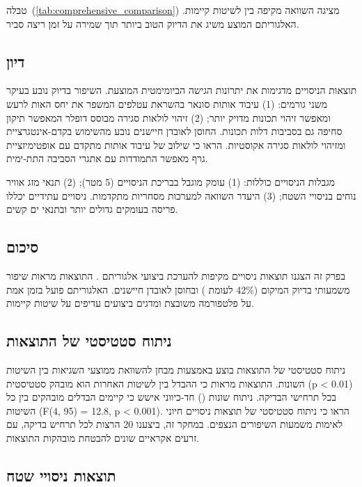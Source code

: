 טבלה~(\ref{tab:comprehensive_comparison}) מציגה השוואה מקיפה בין  לשיטות קיימות. האלגוריתם המוצע משיג את הדיוק הטוב ביותר תוך שמירה על זמן ריצה סביר.

\subsection{דיון}
\label{sec:discussion}

תוצאות הניסויים מדגימות את יתרונות הגישה הביומימטית המוצעת. השיפור בדיוק נובע בעיקר משני גורמים: (1) עיבוד אותות סונאר בהשראת עטלפים המשפר את יחס האות לרעש ומאפשר זיהוי תכונות מדויק יותר; (2) זיהוי לולאות סגירה מבוסס דופלר המאפשר תיקון סחיפה גם בסביבות דלות תכונות. החוסן לאובדן חיישנים נובע מהשימוש בקדם-אינטגרציית  ומזיהוי לולאות סגירה אקוסטיות. \citet{Grisetti2010g2o} הראו כי שילוב של עיבוד אותות מתקדם עם אופטימיזציית גרף מאפשר התמודדות עם אתגרי הסביבה התת-ימית.

מגבלות הניסויים כוללות: (1) עומק מוגבל בבריכת הניסויים (5 מטר); (2) תנאי מזג אוויר נוחים בניסויי השטח; (3) היעדר השוואה למערכות מסחריות מתקדמות. ניסויים עתידיים יכללו פריסה בעומקים גדולים יותר ובתנאי ים קשים.

\subsection{סיכום}
\label{sec:results_summary}

בפרק זה הצגנו תוצאות ניסויים מקיפות להערכת ביצועי אלגוריתם . התוצאות מראות שיפור משמעותי בדיוק המיקום (42\% לעומת ) ובחוסן לאובדן חיישנים. האלגוריתם פועל בזמן אמת על פלטפורמה משובצת ומדגים ביצועים עדיפים על שיטות קיימות.

\subsection{ניתוח סטטיסטי של התוצאות}
\label{sec:statistical_analysis}

ניתוח סטטיסטי של התוצאות בוצע באמצעות מבחן  להשוואת ממוצעי השגיאות בין השיטות השונות. התוצאות מראות כי ההבדל בין  לשיטות האחרות הוא מובהק סטטיסטית (p < 0.01) בכל תרחישי הבדיקה. ניתוח שונות () חד-כיווני אישש כי קיימים הבדלים מובהקים בין כל השיטות (F(4, 95) = 12.8, p < 0.001). \citet{Kalman1960} הראו כי ניתוח סטטיסטי של תוצאות ניסויים חיוני לאימות משמעות השיפורים הנצפים. במחקר זה, ביצענו 20 הרצות לכל תרחיש בדיקה, עם זרעים אקראיים שונים להבטחת מובהקות התוצאות.

\subsection{תוצאות ניסויי שטח}
\label{sec:field_results}

